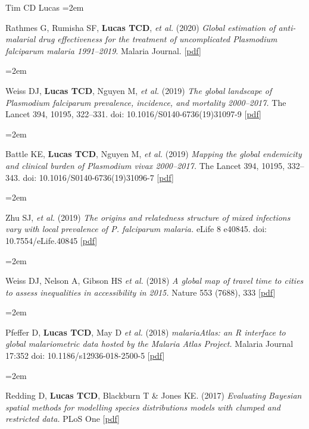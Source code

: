 \documentclass{scrartcl}
\newcommand{\MarginText}[1]{\marginpar{\raggedleft\itshape\small#1}} %
\newcommand{\Description}[1]{\hangindent=2em\hangafter=0\noindent\raggedright\footnotesize{#1}\par\normalsize\vspace{1em}} %
\begin{document}
\begin{cv}{Tim {\Large CD} Lucas}
\Description{Rathmes G, Rumisha SF, \textbf{Lucas TCD}, \emph{et al.} (2020) \emph{Global estimation of anti-malarial drug effectiveness for the treatment of uncomplicated \emph{Plasmodium falciparum} malaria 1991--2019}. Malaria Journal. [\href{https://link.springer.com/article/10.1186/s12936-020-03446-8}{pdf}]}



\Description{\MarginText{2019}Weiss DJ, \textbf{Lucas TCD}, Nguyen M, \emph{et al.} (2019) \emph{The global landscape of \emph{Plasmodium falciparum} prevalence, incidence, and mortality 2000--2017.} The Lancet 394, 10195, 322--331. doi: 10.1016/S0140-6736(19)31097-9 [\href{https://doi.org/10.1016/S0140-6736(19)31097-9}{pdf}]}

\Description{Battle KE, \textbf{Lucas TCD},  Nguyen M, \emph{et al.} (2019) \emph{Mapping the global endemicity and clinical burden of \emph{Plasmodium vivax} 2000--2017.} The Lancet 394, 10195, 332--343. doi: 10.1016/S0140-6736(19)31096-7 [\href{https://doi.org/10.1016/S0140-6736(19)31096-7}{pdf}]}



\Description{Zhu SJ, \emph{et al.} (2019) \emph{The origins and relatedness structure of mixed infections vary with local prevalence of \emph{P. falciparum} malaria.} eLife 8 e40845. doi: 10.7554/eLife.40845 [\href{https://doi.org/10.7554/eLife.40845}{pdf}]}




\Description{\MarginText{2018}Weiss DJ, Nelson A, Gibson HS \emph{et al.} (2018) \emph{A global map of travel time to cities to assess inequalities in accessibility in 2015.} Nature 553 (7688), 333 [\href{https://www.nature.com/articles/nature25181.pdf}{pdf}]}

\Description{Pfeffer D, \textbf{Lucas TCD}, May D \emph{et al.} (2018) \emph{malariaAtlas: an R interface to global malariometric data hosted by the Malaria Atlas Project.} Malaria Journal 17:352 doi: 10.1186/s12936-018-2500-5 [\href{https://malariajournal.biomedcentral.com/track/pdf/10.1186/s12936-018-2500-5}{pdf}]}


\Description{\MarginText{2017}Redding D, \textbf{Lucas TCD}, Blackburn T \& Jones KE. (2017) \emph{Evaluating Bayesian spatial methods for modelling species distributions models with clumped and restricted data.} PLoS One [\href{https://journals.plos.org/plosone/article/file?id=10.1371/journal.pone.0187602&type=printable}{pdf}]}


\end{cv}
\end{document}
